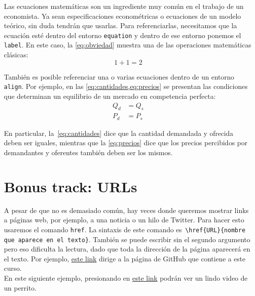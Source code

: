 \documentclass{article}
\begin{document}
Las ecuaciones matemáticas son un ingrediente muy común en el trabajo de un economista. Ya sean especificaciones econométricas o ecuaciones de un modelo teórico, sin duda tendrán que usarlas. Para referenciarlas, necesitamos que la ecuación esté dentro del entorno \texttt{equation} y dentro de ese entorno ponemos el \texttt{label}. En este caso, la \cref{eq:obviedad} muestra una de las operaciones matemáticas clásicas:
	\begin{equation} \label{eq:obviedad}
		1 + 1 = 2 
	\end{equation}

También es posible referenciar una o varias ecuaciones dentro de un entorno \texttt{align}. Por ejemplo, en las \cref{eq:cantidades,eq:precios} se presentan las condiciones que determinan un equilibrio de un mercado en competencia perfecta:
	\begin{align}
		Q_{d}	&=	Q_{s}	\label{eq:cantidades}\\
		P_{d}	&=	P_{s}	\label{eq:precios}
	\end{align}

En particular, la \cref{eq:cantidades} dice que la cantidad demandada y ofrecida deben ser iguales, mientras que la \cref{eq:precios} dice que los precios percibidos por demandantes y oferentes también deben ser los mismos.

\section{Bonus track: URLs} \label{sec:RefURLs}

A pesar de que no es demasiado común, hay veces donde queremos mostrar links a páginas web, por ejemplo, a una noticia o un hilo de Twitter. Para hacer esto usaremos el comando \texttt{href}. La sintaxis de este comando es \texttt{\textbackslash href\{URL\}\{nombre que aparece en el texto\}}. También se puede escribir sin el segundo argumento pero eso dificulta la lectura, dado que toda la dirección de la página aparecerá en el texto. Por ejemplo, \href{https://github.com/pipeton8/latex-course}{este link} dirige a la página de GitHub que contiene a este curso.\\

En este siguiente ejemplo, presionando en \href{https://twitter.com/dog_rates/status/1295801698221346816?s=20}{este link} podrán ver un lindo video de un perrito.

\printbibliography
\end{document}
